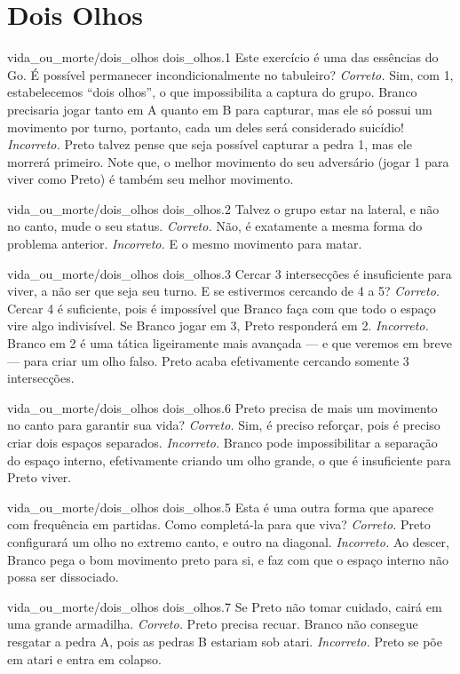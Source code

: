\chapter{Dois Olhos}

\emptypage

\problemAnswerDiagram
  {vida_ou_morte/dois_olhos}
  {dois_olhos.1}
  {Este exercício é uma das essências do Go. É possível permanecer incondicionalmente no tabuleiro?}
  {\emph{Correto.} Sim, com 1, estabelecemos ``dois olhos'', o que impossibilita a captura do grupo. Branco precisaria jogar tanto em A quanto em B para capturar, mas ele só possui um movimento por turno, portanto, cada um deles será considerado suicídio!}
  {\emph{Incorreto.} Preto talvez pense que seja possível capturar a pedra 1, mas ele morrerá primeiro. Note que, o melhor movimento do seu adversário (jogar 1 para viver como Preto) é também seu melhor movimento.}

\problemAnswerDiagram
  {vida_ou_morte/dois_olhos}
  {dois_olhos.2}
  {Talvez o grupo estar na lateral, e não no canto, mude o seu status.}
  {\emph{Correto.} Não, é exatamente a mesma forma do problema anterior.}
  {\emph{Incorreto.} E o mesmo movimento para matar.}

\problemAnswerDiagram
  {vida_ou_morte/dois_olhos}
  {dois_olhos.3}
  {Cercar 3 intersecções é insuficiente para viver, a não ser que seja seu turno. E se estivermos cercando de 4 a 5?}
  {\emph{Correto.} Cercar 4 é suficiente, pois é impossível que Branco faça com que todo o espaço vire algo indivisível. Se Branco jogar em 3, Preto responderá em 2.}
  {\emph{Incorreto.} Branco em 2 é uma tática ligeiramente mais avançada --- e que veremos em breve --- para criar um olho falso. Preto acaba efetivamente cercando somente 3 intersecções.}

\problemAnswerDiagram
  {vida_ou_morte/dois_olhos}
  {dois_olhos.6}
  {Preto precisa de mais um movimento no canto para garantir sua vida?}
  {\emph{Correto.} Sim, é preciso reforçar, pois é preciso criar dois espaços separados.}
  {\emph{Incorreto.} Branco pode impossibilitar a separação do espaço interno, efetivamente criando um olho grande, o que é insuficiente para Preto viver.}

\problemAnswerDiagram
  {vida_ou_morte/dois_olhos}
  {dois_olhos.5}
  {Esta é uma outra forma que aparece com frequência em partidas. Como completá-la para que viva?}
  {\emph{Correto.} Preto configurará um olho no extremo canto, e outro na diagonal.}
  {\emph{Incorreto.} Ao descer, Branco pega o bom movimento preto para si, e faz com que o espaço interno não possa ser dissociado.}

\problemAnswerDiagram
  {vida_ou_morte/dois_olhos}
  {dois_olhos.7}
  {Se Preto não tomar cuidado, cairá em uma grande armadilha.}
  {\emph{Correto.} Preto precisa recuar. Branco não consegue resgatar a pedra A, pois as pedras B estariam sob atari.}
  {\emph{Incorreto.} Preto se põe em atari e entra em colapso.}